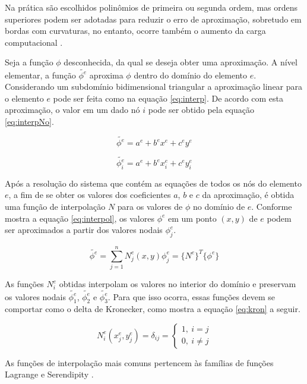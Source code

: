 \documentclass[
    12pt,               %
    openright,          %
    oneside,
    a4paper,            %
    english,            %
    french,             %
    spanish,            %
    brazil              %
    ]{abntex2}
\begin{document}
Na prática são escolhidos polinômios de primeira ou segunda ordem, mas ordens superiores podem ser adotadas para reduzir o erro de aproximação, sobretudo em bordas com curvaturas, no entanto, ocorre também o aumento da carga computacional \cite{jin}.

Seja a função $\phi$ desconhecida, da qual se deseja obter uma aproximação. A nível elementar, a função $\tilde{\phi^e}$ aproxima $\phi$ dentro do domínio do elemento $e$. Considerando um subdomínio bidimensional triangular a aproximação linear para o elemento $e$ pode ser feita como na equação \ref{eq:interp}. De acordo com esta aproximação, o valor em um dado nó $i$ pode ser obtido pela equação \ref{eq:interpNo}.

\begin{equation}
\label{eq:interp}
\tilde{\phi^e} = a^e + b^e x^e + c^e y^e
\end{equation}

\begin{equation}
\label{eq:interpNo}
\tilde{\phi^e_i} = a^e + b^e x^e_i + c^e y^e_i
\end{equation}

Após a resolução do sistema que contém as equações de todos os nós do elemento $e$, a fim de se obter os valores dos coeficientes $a$, $b$ e $c$ da aproximação, é obtida uma função de interpolação $N$ para os valores de $\phi$ no domínio de $e$. Conforme mostra a equação \ref{eq:interpol}, os valores $\phi^e$ em um ponto $(x,y)$ de $e$ podem ser aproximados a partir dos valores nodais $\phi^e_j$.

\begin{equation}
\label{eq:interpol}
\tilde{\phi^e} = \sum_{j=1}^{n}{N_j^e (x, y) \phi_j^e} = 
\{N^e\}^T \{\phi^e\}
\end{equation}

As funções $N_i^e$ obtidas interpolam os valores no interior do domínio e preservam os valores nodais $\tilde{\phi^e_1}$, $\tilde{\phi^e_2}$ e $\tilde{\phi^e_3}$. Para que isso ocorra, essas funções devem se comportar como o delta de Kronecker, como mostra a equação \ref{eq:kron} a seguir.

\begin{equation}
\label{eq:kron}
N_i^e(x^e_j, y^e_j) = \delta_{ij} = \begin{cases}
1, \ i = j\\
0, \ i \neq j
\end{cases}
\end{equation}

As funções de interpolação mais comuns pertencem às famílias de funções Lagrange e Serendipity \cite{zien, volakis}.
\end{document}
